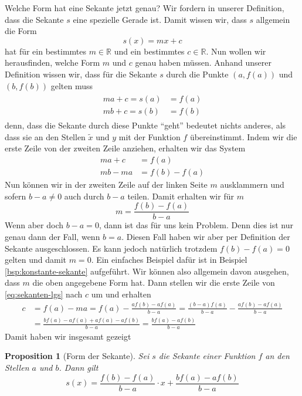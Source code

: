 \documentclass[11pt,reqno, a4paper]{book}
\theoremstyle{mystyle}
\newtheorem{proposition}[theorem]{Proposition}
\theoremstyle{definition}
\numberwithin{equation}{chapter}
\begin{document}
Welche Form hat eine Sekante jetzt genau? Wir fordern in unserer Definition, dass die Sekante \(s\) eine spezielle Gerade ist. Damit wissen wir, dass \(s\) allgemein die Form 
\begin{equation*}
    s(x) = mx + c
\end{equation*}
hat für ein bestimmtes \(m \in \mathbb R\) und ein bestimmtes \(c \in \mathbb R\). Nun wollen wir herausfinden, welche Form \(m\) und \(c\) genau haben müssen. Anhand unserer Definition wissen wir, dass für die Sekante \(s\) durch die Punkte \((a, f(a))\) und \((b,f(b))\) gelten muss 
\begin{align}
    \begin{split}\label{eq:sekanten-lgs}
        m a + c = s(a) &= f(a) \\
        m b + c = s(b) &= f(b)
    \end{split}
\end{align}
denn, dass die Sekante durch diese Punkte "`geht"' bedeutet nichts anderes, als dass sie an den Stellen \(\tilde x\) und \(y\) mit der Funktion \(f\) übereinstimmt. Indem wir die erste Zeile von der zweiten Zeile anziehen, erhalten wir das System
\begin{align*}
    m a + c &= f(a) \\
    mb - ma &= f(b) - f(a)
\end{align*}
Nun können wir in der zweiten Zeile auf der linken Seite \(m\) ausklammern und sofern \(b - a \neq 0\) auch durch \(b - a\) teilen. Damit erhalten wir für \(m\)
\begin{equation*}
    m = \frac{f(b) - f(a)}{b-a}
\end{equation*}
Wenn aber doch \(b - a = 0\), dann ist das für uns kein Problem. Denn dies ist nur genau dann der Fall, wenn \(b=a\). Diesen Fall haben wir aber per Definition der Sekante ausgeschlossen. Es kann jedoch natürlich trotzdem \(f(b) - f(a) = 0\) gelten und damit \(m=0\). Ein einfaches Beispiel dafür ist in Beispiel \ref{bsp:konstante-sekante} aufgeführt. Wir können also allgemein davon ausgehen, dass \(m\) die oben angegebene Form hat. Dann stellen wir die erste Zeile von \eqref{eq:sekanten-lgs} nach \(c\) um und erhalten 
\begin{align*}
    c &= f(a) - ma = f(a) - \frac{af(b) - af(a)}{b-a} = \frac{(b-a)f(a)}{b-a} - \frac{af(b) - af(a)}{b-a} \\ 
    &= \frac{bf(a) - af(a) + af(a) - af(b)}{b-a} = \frac{bf(a) - af(b)}{b-a}
\end{align*}
Damit haben wir insgesamt gezeigt
\begin{proposition}[Form der Sekante]\label{prop:form-der-sekante}
    Sei \(s\) die Sekante einer Funktion \(f\) an den Stellen \(a\) und \(b\). Dann gilt 
    \begin{equation*}
        s(x) = \frac{f(b) - f(a)}{b-a}\cdot x + \frac{bf(a) - af(b)}{b-a}
    \end{equation*}
\end{proposition}
\end{document}
